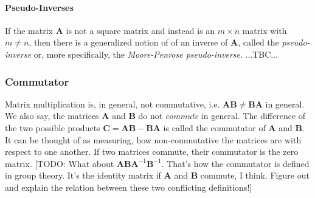 \paragraph{Pseudo-Inverses}
If the matrix $\mathbf{A}$ is not a square matrix and instead is an $m \times n$ matrix with $m \neq n$, then there is a generalized notion of of an inverse of $\mathbf{A}$, called the \emph{pseudo-inverse} or, more specifically, the \emph{Moore-Penrose pseudo-inverse}. ...TBC...







\subsubsection{Commutator}
Matrix multiplication is, in general, not commutative, i.e. $\mathbf{A} \mathbf{B} \neq \mathbf{B} \mathbf{A}$ in general. We also say, the matrices  $\mathbf{A}$ and $\mathbf{B}$ do not \emph{commute} in general. The difference of the two possible products $\mathbf{C} = \mathbf{A} \mathbf{B} - \mathbf{B} \mathbf{A}$ is called the commutator of $\mathbf{A}$ and $\mathbf{B}$. It can be thought of as measuring, how non-commutative the matrices are with respect to one another. If two matrices commute, their commutator is the zero matrix. [TODO: What about $\mathbf{A} \mathbf{B} \mathbf{A}^{-1} \mathbf{B}^{-1}$. That's how the commutator is defined in group theory. It's the identity matrix if  $\mathbf{A}$ and $\mathbf{B}$ commute, I think. Figure out and explain the relation between these two conflicting definitions!]


